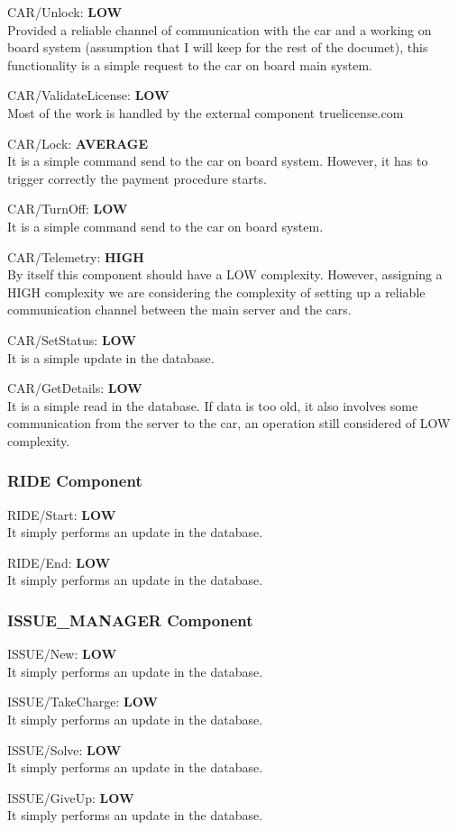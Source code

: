 \documentclass[11pt]{article} %
\newcommand{\extInput}[3]{ #1:  \textbf{#2} \\ #3  }
\begin{document}
\begin{description}
	\item \extInput
		{CAR/Unlock}
		{LOW}
		{Provided a reliable channel of communication with the car and a working on board system (assumption that I will keep for the rest of the documet), this functionality is a simple request to the car on board main system.}
	\item \extInput
		{CAR/ValidateLicense}
		{LOW}
		{Most of the work is handled by the external component truelicense.com}
	\item \extInput
		{CAR/Lock}
		{AVERAGE}
		{It is a simple command send to the car on board system. However, it has to trigger correctly the payment procedure starts.}
	\item \extInput
		{CAR/TurnOff}
		{LOW}
		{It is a simple command send to the car on board system.}
	\item \extInput
		{CAR/Telemetry}
		{HIGH}
		{By itself this component should have a LOW complexity. However, assigning a HIGH complexity we are considering the complexity of setting up a reliable communication channel between the main server and the cars.}
	\item \extInput
		{CAR/SetStatus}
		{LOW}
		{It is a simple update in the database.}
	\item \extInput
		{CAR/GetDetails}
		{LOW}
		{It is a simple read in the database. If data is too old, it also involves some communication from the server to the car, an operation still considered of LOW complexity.}
\end{description}

\subsubsection{RIDE Component}

\begin{description}
	\item \extInput
		{RIDE/Start}
		{LOW}
		{It simply performs an update in the database.}
	\item \extInput
		{RIDE/End}
		{LOW}
		{It simply performs an update in the database.}
\end{description}

\subsubsection{ISSUE\_MANAGER Component}

\begin{description}
	\item \extInput
		{ISSUE/New}
		{LOW}
		{It simply performs an update in the database.}
	\item \extInput
		{ISSUE/TakeCharge}
		{LOW}
		{It simply performs an update in the database.}
	\item \extInput
		{ISSUE/Solve}
		{LOW}
		{It simply performs an update in the database.}
	\item \extInput
		{ISSUE/GiveUp}
		{LOW}
		{It simply performs an update in the database.}
\end{description}
\end{document}
